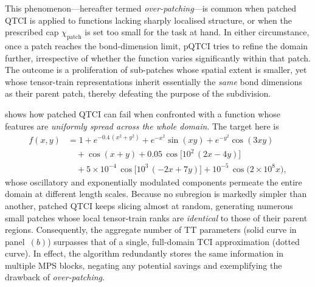 This phenomenon—hereafter termed \emph{over-patching}—is common when patched QTCI is applied to functions lacking sharply localised structure, or when the prescribed cap $\chi_{\text{patch}}$ is set too small for the task at hand.  
In either circumstance, once a patch reaches the bond-dimension limit, pQTCI tries to refine the domain further, irrespective of whether the function varies significantly within that patch.  
The outcome is a proliferation of sub-patches whose spatial extent is smaller, yet whose tensor-train representations inherit essentially the \emph{same} bond dimensions as their parent patch, thereby defeating the purpose of the subdivision.



 shows how patched QTCI can fail when confronted with a function whose features are \emph{uniformly spread across the whole domain}.  
The target here is  
\begin{align}
\label{eq:2Dfunction}
f(x,y) &=
  1
  + e^{-0.4\,(x^{2}+y^{2})}
  + e^{-x^{2}}\sin(xy)
  + e^{-y^{2}}\cos(3xy) \\
  &\quad + \cos(x+y)
  + 0.05\,\cos\!\bigl[10^{2}\,(2x-4y)\bigr] \nonumber\\
  &\quad + 5\!\times\!10^{-4}\,\cos\!\bigl[10^{3}\,(-2x+7y)\bigr]
  + 10^{-5}\,\cos\!\bigl(2\times10^{8}x\bigr), \nonumber
\end{align}
whose oscillatory and exponentially modulated components permeate the entire domain at different length scales.  
Because no subregion is markedly simpler than another, patched QTCI keeps slicing almost at random, generating numerous small patches whose local tensor-train ranks are \emph{identical} to those of their parent regions.  
Consequently, the aggregate number of TT parameters (solid curve in panel~$(b)$) surpasses that of a single, full-domain TCI approximation (dotted curve).  
In effect, the algorithm redundantly stores the same information in multiple MPS blocks, negating any potential savings and exemplifying the drawback of \emph{over-patching}.



